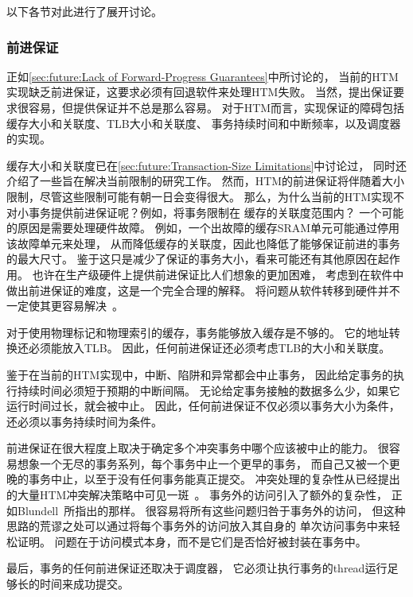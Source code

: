 以下各节对此进行了展开讨论。

\subsubsection{前进保证}
\label{sec:future:Forward-Progress Guarantees}

正如\cref{sec:future:Lack of Forward-Progress Guarantees}中所讨论的，
当前的HTM实现缺乏前进保证，这要求必须有回退软件来处理HTM失败。
当然，提出保证要求很容易，但提供保证并不总是那么容易。
对于HTM而言，实现保证的障碍包括缓存大小和关联度、TLB大小和关联度、
事务持续时间和中断频率，以及调度器的实现。

缓存大小和关联度已在\cref{sec:future:Transaction-Size Limitations}中讨论过，
同时还介绍了一些旨在解决当前限制的研究工作。
然而，HTM的前进保证将伴随着大小限制，尽管这些限制可能有朝一日会变得很大。
那么，为什么当前的HTM实现不对小事务提供前进保证呢？例如，将事务限制在
缓存的关联度范围内？
一个可能的原因是需要处理硬件故障。
例如，一个出故障的缓存SRAM单元可能通过停用该故障单元来处理，
从而降低缓存的关联度，因此也降低了能够保证前进的事务的最大尺寸。
鉴于这只是减少了保证的事务大小，看来可能还有其他原因在起作用。
也许在生产级硬件上提供前进保证比人们想象的更加困难，
考虑到在软件中做出前进保证的难度，这是一个完全合理的解释。
将问题从软件转移到硬件并不一定使其更容易解决~\cite{ChristianJacobi2012MainframeTM}。

对于使用物理标记和物理索引的缓存，事务能够放入缓存是不够的。
它的地址转换还必须能放入TLB\@。
因此，任何前进保证还必须考虑TLB的大小和关联度。

鉴于在当前的HTM实现中，中断、陷阱和异常都会中止事务，
因此给定事务的执行持续时间必须短于预期的中断间隔。
无论给定事务接触的数据多么少，如果它运行时间过长，就会被中止。
因此，任何前进保证不仅必须以事务大小为条件，还必须以事务持续时间为条件。

前进保证在很大程度上取决于确定多个冲突事务中哪个应该被中止的能力。
很容易想象一个无尽的事务系列，每个事务中止一个更早的事务，
而自己又被一个更晚的事务中止，以至于没有任何事务能真正提交。
冲突处理的复杂性从已经提出的大量HTM冲突解决策略中可见一斑~\cite{EgeAkpinar2011HTM2TLE,YujieLiu2011ToxicTransactions}。
事务外的访问引入了额外的复杂性，
正如Blundell~\cite{Blundell2006TMdeadlock}所指出的那样。
很容易将所有这些问题归咎于事务外的访问，
但这种思路的荒谬之处可以通过将每个事务外的访问放入其自身的
单次访问事务中来轻松证明。
问题在于访问模式本身，而不是它们是否恰好被封装在事务中。

最后，事务的任何前进保证还取决于调度器，
它必须让执行事务的thread运行足够长的时间来成功提交。

